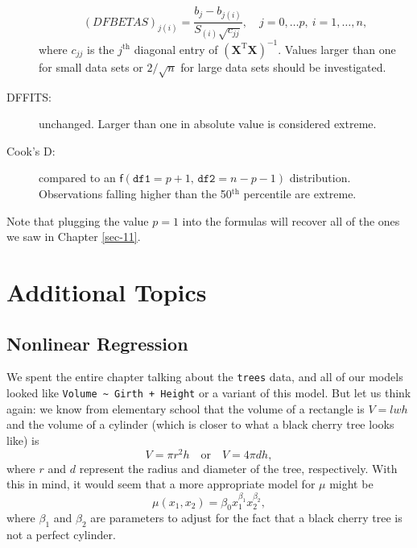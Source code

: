 \documentclass[captions=tableheading]{scrbook}
\begin{document}
\begin{description}
   \begin{equation}
   (DFBETAS)_{j(i)}=\frac{b_{j}-b_{j(i)}}{S_{(i)}\sqrt{c_{jj}}},\quad j=0,\ldots p,\ i=1,\ldots,n,
   \end{equation}
   where \(c_{jj}\) is the \(j^{\mathrm{th}}\) diagonal entry of \((\mathbf{X}^{\mathrm{T}}\mathbf{X})^{-1}\). Values larger than one for small data sets or \(2/\sqrt{n}\) for large data sets should be investigated.
\item[DFFITS:] unchanged. Larger than one in absolute value is considered extreme.
\item[Cook's D:] compared to an \(\mathsf{f}(\mathtt{df1}=p+1,\,\mathtt{df2}=n-p-1)\) distribution. Observations falling higher than the 50\(^{\textrm{th}}\) percentile are extreme.
\end{description}
Note that plugging the value \(p=1\) into the formulas will recover all of the ones we saw in Chapter \ref{sec-11}.
\section{Additional Topics}
\label{sec-12-9}
\label{sec-Additional-Topics-MLR}
\subsection{Nonlinear Regression}
\label{sec-12-9-1}


We spent the entire chapter talking about the \texttt{trees} data, and all of our models looked like \texttt{Volume \textasciitilde{} Girth + Height} or a variant of this model. But let us think again: we know from elementary school that the volume of a rectangle is \(V=lwh\) and the volume of a cylinder (which is closer to what a black cherry tree looks like) is
\begin{equation}
V=\pi r^{2}h\quad \mbox{or}\quad V=4\pi dh,
\end{equation}
where \(r\) and \(d\) represent the radius and diameter of the tree, respectively. With this in mind, it would seem that a more appropriate model for \(\mu\) might be
\begin{equation}
\mu(x_{1},x_{2})=\beta_{0}x_{1}^{\beta_{1}}x_{2}^{\beta_{2}},\label{eq-trees-nonlin-reg}
\end{equation}
where \(\beta_{1}\) and \(\beta_{2}\) are parameters to adjust for the fact that a black cherry tree is not a perfect cylinder.
\end{document}
